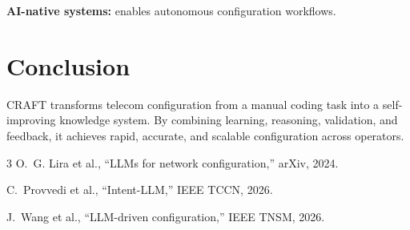 \documentclass[10pt]{article}
\begin{document}
\textbf{AI-native systems:} enables autonomous configuration workflows.

\section{Conclusion}

CRAFT transforms telecom configuration from a manual coding task into a self-improving knowledge system. By combining learning, reasoning, validation, and feedback, it achieves rapid, accurate, and scalable configuration across operators.

\begin{thebibliography}{3}
\small
{}
O.~G. Lira et al., ``LLMs for network configuration,'' arXiv, 2024.

C.~Provvedi et al., ``Intent-LLM,'' IEEE TCCN, 2026.

J.~Wang et al., ``LLM-driven configuration,'' IEEE TNSM, 2026.
\end{thebibliography}
\end{document}
